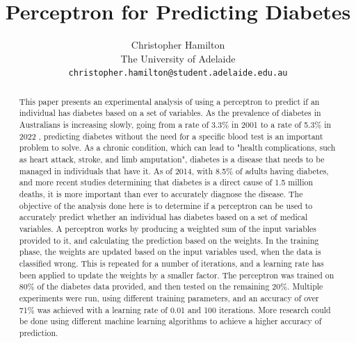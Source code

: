 \documentclass[10pt,twocolumn,a4paper]{article}
\begin{document}
\title{Perceptron for Predicting Diabetes}

\author{Christopher Hamilton\\
The University of Adelaide\\
{\tt\small christopher.hamilton@student.adelaide.edu.au}
}

\maketitle

\begin{abstract}
   This paper presents an experimental analysis of using a perceptron to predict if an individual has diabetes based on a set of variables. As the prevalence of diabetes in Australians is increasing slowly, going from a rate of 3.3\% in 2001 to a rate of 5.3\% in 2022 \cite{diabetes-abs}, predicting diabetes without the need for a specific blood test is an important problem to solve. As a chronic condition, which can lead to "health complications, such as heart attack, stroke, and limb amputation"\cite{diabetes-abs}, diabetes is a disease that needs to be managed in individuals that have it. As of 2014, with 8.5\% of adults having diabetes, and more recent studies determining that diabetes is a direct cause of 1.5 million deaths\cite{diabetes-who}, it is more important than ever to accurately diagnose the disease. The objective of the analysis done here is to determine if a perceptron can be used to accurately predict whether an individual has diabetes based on a set of medical variables. A perceptron works by producing a weighted sum of the input variables provided to it, and calculating the prediction based on the weights.\cite{LIANG20201} In the training phase, the weights are updated based on the input variables used, when the data is classified wrong. This is repeated for a number of iterations, and a learning rate has been applied to update the weights by a smaller factor. The perceptron was trained on 80\% of the diabetes data provided, and then tested on the remaining 20\%. Multiple experiments were run, using different training parameters, and an accuracy of over 71\% was achieved with a learning rate of 0.01 and 100 iterations. More research could be done using different machine learning algorithms to achieve a higher accuracy of prediction.
\end{abstract}
\end{document}
